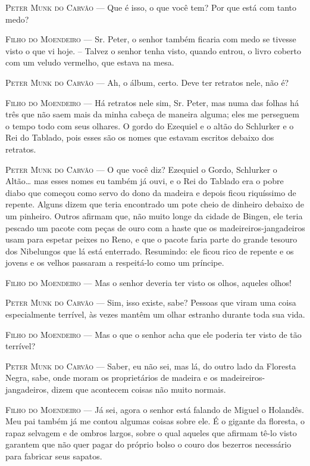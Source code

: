 \textsc{Peter Munk do Carvão} --- Que é isso, o que você tem? Por que está com
tanto medo?

\textsc{Filho do Moendeiro} --- Sr. Peter, o senhor também ficaria com medo se
tivesse visto o que vi hoje. -- Talvez o senhor tenha visto, quando
entrou, o livro coberto com um veludo vermelho, que estava na mesa.

\textsc{Peter Munk do Carvão} --- Ah, o álbum, certo. Deve ter retratos nele, não
é?

\textsc{Filho do Moendeiro} --- Há retratos nele sim, Sr. Peter, mas numa das
folhas há três que não saem mais da minha cabeça de maneira alguma; eles
me perseguem o tempo todo com seus olhares. O gordo do Ezequiel e o
altão do Schlurker e o Rei do Tablado, pois esses são os nomes que
estavam escritos debaixo dos retratos.

\textsc{Peter Munk do Carvão} --- O que você diz? Ezequiel o Gordo, Schlurker o
Altão\ldots{} mas esses nomes eu também já ouvi, e o Rei do Tablado era o
pobre diabo que começou como servo do dono da madeira e depois ficou
riquíssimo de repente. Alguns dizem que teria encontrado um pote cheio
de dinheiro debaixo de um pinheiro. Outros afirmam que, não muito longe
da cidade de Bingen, ele teria pescado um pacote com peças de ouro com a
haste que os madeireiros-jangadeiros usam para espetar peixes no Reno, e
que o pacote faria parte do grande tesouro dos Nibelungos que lá está
enterrado. Resumindo: ele ficou rico de repente e os jovens e os velhos
passaram a respeitá-lo como um príncipe.

\textsc{Filho do Moendeiro} --- Mas o senhor deveria ter visto os olhos, aqueles
olhos!

\textsc{Peter Munk do Carvão} --- Sim, isso existe, sabe? Pessoas que viram uma
coisa especialmente terrível, às vezes mantêm um olhar estranho durante
toda sua vida.

\textsc{Filho do Moendeiro} --- Mas o que o senhor acha que ele poderia ter visto
de tão terrível?

\textsc{Peter Munk do Carvão} --- Saber, eu não sei, mas lá, do outro lado da
Floresta Negra, sabe, onde moram os proprietários de madeira e os
madeireiros-jangadeiros, dizem que acontecem coisas não muito normais.

\textsc{Filho do Moendeiro} --- Já sei, agora o senhor está falando de Miguel o
Holandês. Meu pai também já me contou algumas coisas sobre ele. É o
gigante da floresta, o rapaz selvagem e de ombros largos, sobre o qual
aqueles que afirmam tê-lo visto garantem que não quer pagar do próprio
bolso o couro dos bezerros necessário para fabricar seus sapatos.

